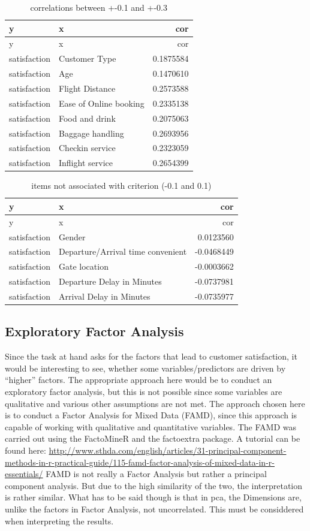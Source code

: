 \documentclass[
]{article}
\begin{document}
\begin{longtable}[]{@{}llr@{}}
\caption{correlations between +-0.1 and +-0.3}\tabularnewline
\toprule
y & x & cor\tabularnewline
\midrule
\endfirsthead
\toprule
y & x & cor\tabularnewline
\midrule
\endhead
satisfaction & Customer Type & 0.1875584\tabularnewline
satisfaction & Age & 0.1470610\tabularnewline
satisfaction & Flight Distance & 0.2573588\tabularnewline
satisfaction & Ease of Online booking & 0.2335138\tabularnewline
satisfaction & Food and drink & 0.2075063\tabularnewline
satisfaction & Baggage handling & 0.2693956\tabularnewline
satisfaction & Checkin service & 0.2323059\tabularnewline
satisfaction & Inflight service & 0.2654399\tabularnewline
\bottomrule
\end{longtable}

\begin{longtable}[]{@{}llr@{}}
\caption{items not associated with criterion (-0.1 and
0.1)}\tabularnewline
\toprule
y & x & cor\tabularnewline
\midrule
\endfirsthead
\toprule
y & x & cor\tabularnewline
\midrule
\endhead
satisfaction & Gender & 0.0123560\tabularnewline
satisfaction & Departure/Arrival time convenient &
-0.0468449\tabularnewline
satisfaction & Gate location & -0.0003662\tabularnewline
satisfaction & Departure Delay in Minutes & -0.0737981\tabularnewline
satisfaction & Arrival Delay in Minutes & -0.0735977\tabularnewline
\bottomrule
\end{longtable}

\hypertarget{exploratory-factor-analysis}{%
\subsection{Exploratory Factor
Analysis}\label{exploratory-factor-analysis}}

Since the task at hand asks for the factors that lead to customer
satisfaction, it would be interesting to see, whether some
variables/predictors are driven by ``higher'' factors. The appropriate
approach here would be to conduct an exploratory factor analysis, but
this is not possible since some variables are qualitative and various
other assumptions are not met. The approach chosen here is to conduct a
Factor Analysis for Mixed Data (FAMD), since this approach is capable of
working with qualitative and quantitative variables. The FAMD was
carried out using the FactoMineR and the factoextra package. A tutorial
can be found here:
\url{http://www.sthda.com/english/articles/31-principal-component-methods-in-r-practical-guide/115-famd-factor-analysis-of-mixed-data-in-r-essentials/}
FAMD is not really a Factor Analysis but rather a principal component
analysis. But due to the high similarity of the two, the interpretation
is rather similar. What has to be said though is that in pca, the
Dimensions are, unlike the factors in Factor Analysis, not uncorrelated.
This must be considdered when interpreting the results.
\end{document}
